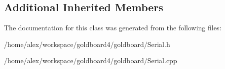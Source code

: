 \subsection*{Additional Inherited Members}


The documentation for this class was generated from the following files\+:\begin{DoxyCompactItemize}
\item 
/home/alex/workspace/goldboard4/goldboard/Serial.\+h\item 
/home/alex/workspace/goldboard4/goldboard/Serial.\+cpp\end{DoxyCompactItemize}
